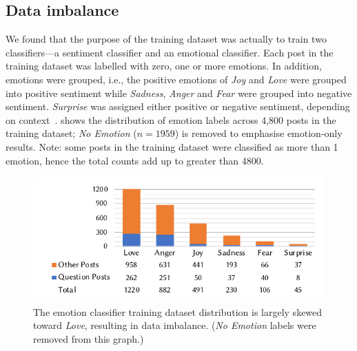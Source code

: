 \subsection{Data imbalance}
 We found that the purpose of the training dataset was actually to train two classifiers---a sentiment classifier and an emotional classifier.  Each post in the training dataset was labelled with zero, one or more emotions. In addition, emotions were grouped, i.e., the positive emotions of \textit{Joy} and \textit{Love} were grouped into positive sentiment while \textit{Sadness}, \textit{Anger} and \textit{Fear} were grouped into negative sentiment. \textit{Surprise} was assigned either positive or negative sentiment, depending on context~\citep{novielli2018, calefato2018}.   shows the distribution of emotion labels across 4,800 posts in the training dataset; \textit{No Emotion} ($n=1959$) is removed to emphasise emotion-only results. Note: some posts in the training dataset were classified as more than 1 emotion, hence the total counts add up to greater than 4800.

\begin{figure}
    \centering
    \includegraphics[width=.8\linewidth]{data-imbalance.pdf}
    \caption [Emotion classifier training data imbalance]{The emotion classifier training dataset distribution is largely skewed toward \textit{Love}, resulting in data imbalance. (\textit{No Emotion} labels were removed from this graph.)}
    \label{caise2021:fig:data-imbalance-training}
\end{figure} 

